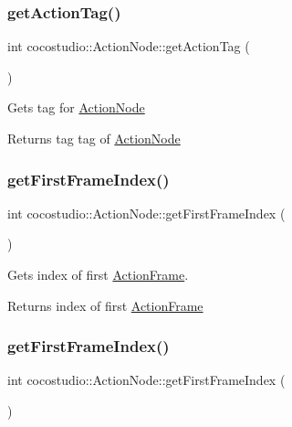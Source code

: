 \subsubsection{\texorpdfstring{get\+Action\+Tag()}{getActionTag()}\hspace{0.1cm}{\footnotesize\ttfamily [2/2]}}
{\footnotesize\ttfamily int cocostudio\+::\+Action\+Node\+::get\+Action\+Tag (\begin{DoxyParamCaption}{ }\end{DoxyParamCaption})}

Gets tag for \hyperlink{classcocostudio_1_1ActionNode}{Action\+Node}

\begin{DoxyReturn}{Returns}
tag tag of \hyperlink{classcocostudio_1_1ActionNode}{Action\+Node} 
\end{DoxyReturn}
\mbox{\label{classcocostudio_1_1ActionNode_acd66f401500fc2dc3bbe561f5b58f177}} 
\subsubsection{\texorpdfstring{get\+First\+Frame\+Index()}{getFirstFrameIndex()}\hspace{0.1cm}{\footnotesize\ttfamily [1/2]}}
{\footnotesize\ttfamily int cocostudio\+::\+Action\+Node\+::get\+First\+Frame\+Index (\begin{DoxyParamCaption}{ }\end{DoxyParamCaption})}

Gets index of first \hyperlink{classcocostudio_1_1ActionFrame}{Action\+Frame}.

\begin{DoxyReturn}{Returns}
index of first \hyperlink{classcocostudio_1_1ActionFrame}{Action\+Frame} 
\end{DoxyReturn}
\mbox{\label{classcocostudio_1_1ActionNode_acd66f401500fc2dc3bbe561f5b58f177}} 
\subsubsection{\texorpdfstring{get\+First\+Frame\+Index()}{getFirstFrameIndex()}\hspace{0.1cm}{\footnotesize\ttfamily [2/2]}}
{\footnotesize\ttfamily int cocostudio\+::\+Action\+Node\+::get\+First\+Frame\+Index (\begin{DoxyParamCaption}{ }\end{DoxyParamCaption})}

